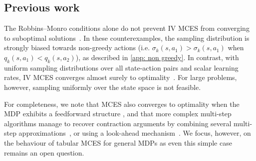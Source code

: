 \documentclass{article}
\begin{document}




\subsection{Previous work}

The Robbins--Monro conditions alone do not prevent IV MCES from converging to suboptimal solutions~\cite{Bertsekas1996Neuro-DynamicProgramming, Wang2022OnLearning}.
In these counterexamples, the sampling distribution is strongly biased towards non-greedy actions (i.e. $\sigma_k(s,a_1)>\sigma_k(s,a_1)$ when $q_k(s,a_1)<q_k(s,a_2)$), as described in \autoref{app: non greedy}.
In contrast, with uniform sampling distributions over all state-action pairs and scalar learning rates, IV MCES converges almost surely to optimality~\cite{Tsitsiklis2002OnIteration, Chen2018OnProblem, Liu2021OnStarts}.
For large problems, however, sampling uniformly over the state space is not feasible.


For completeness, we note that MCES also converges to optimality when the MDP exhibits a feedforward structure \citep{Wang2022OnLearning, Lubars2021OptimisticStructure}, and that 
more complex multi-step algorithms manage to recover contraction arguments 
by combining several multi-step approximations~\citep{Munos2016SafeLearning},
or using a look-ahead mechanism~\citep{Winnicki2023OnEvaluation}.
We focus, however, on the behaviour of tabular MCES for general MDPs as even this simple case remains an open question.
\end{document}
